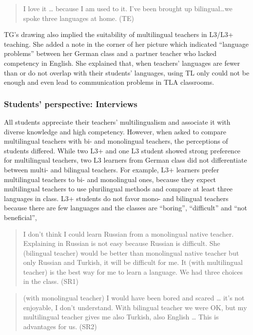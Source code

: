 \documentclass[output=paper]{../langscibook}
\begin{document}
\begin{quote}
I love it … because I am used to it. I’ve been brought up bilingual…we spoke three languages at home. (TE) 
\end{quote}

TG’s drawing also implied the suitability of multilingual teachers in L3/L3+ teaching. She added a note in the corner of her picture which indicated “language problems” between her German class and a partner teacher who lacked competency in English. She explained that, when teachers’ languages are fewer than or do not overlap with their students’ languages, using TL only could not be enough and even lead to communication problems in TLA classrooms.


\subsubsection{Students’ perspective: Interviews}
All students appreciate their teachers’ multilingualism and associate it with diverse knowledge and high competency. However, when asked to compare multilingual teachers with bi- and monolingual teachers, the perceptions of students differed. While two L3+ and one L3 student showed strong preference for multilingual teachers, two L3 learners from German class did not differentiate between multi- and bilingual teachers. For example, L3+ learners prefer multilingual teachers to bi- and monolingual ones, because they expect multilingual teachers to use plurilingual methods and compare at least three languages in class. L3+ students do not favor mono- and bilingual teachers because there are few languages and the classes are “boring”, “difficult” and “not beneficial”, 

\begin{quote}
I don’t think I could learn Russian from a monolingual native teacher. Explaining in Russian is not easy because Russian is difficult. She (bilingual teacher) would be better than monolingual native teacher but only Russian and Turkish, it will be difficult for me. It (with multilingual teacher) is the best way for me to learn a language. We had three choices in the class. (SR1)
\end{quote}

\begin{quote}
(with monolingual teacher) I would have been bored and scared … it’s not enjoyable, I don’t understand. With bilingual teacher we were OK, but my multilingual teacher gives me also Turkish, also English … This is advantages for us. (SR2)
\end{quote}
\end{document}
